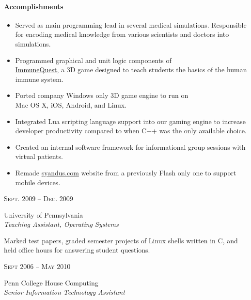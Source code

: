 \documentclass[10pt]{article} %
\begin{document}
{\begin{minipage}[t]{0.5\textwidth}
\paragraph{Accomplishments}
\begin{itemize}
  \setlength\itemsep{0.0em}
  \item Served as main programming lead in several medical simulations. Responsible for encoding medical knowledge from various scientists and doctors into simulations.
  \item Programmed graphical and unit logic components of \\\href{http://immunequest.com}{ImmuneQuest}, a 3D game designed to teach students the basics of the human immune system.
  \item Ported company Windows only 3D game engine to run on \\Mac OS X, iOS, Android, and Linux.
  \item Integrated Lua scripting language support into our gaming engine to increase developer productivity compared to when C++ was the only available choice.
  \item Created an internal software framework for informational group sessions with virtual patients.
  \item Remade \href{http://syandus.com}{syandus.com} website from
    a previously Flash only one to support mobile devices.
\end{itemize}


{\raggedleft\textsc{Sept. 2009 -- Dec. 2009}\par}

{\raggedright\large University of Pennsylvania\\
\textit{Teaching Assistant, Operating Systems}\\[5pt]}

\normalsize{Marked test papers, graded semester projects of Linux shells written in C, and held office hours for answering student questions.}\\


{\raggedleft\textsc{Sept 2006 -- May 2010}\par}

{\raggedright\large Penn College House Computing\\
\textit{Senior Information Technology Assistant}\\[5pt]}


\end{minipage}}
\end{document}
